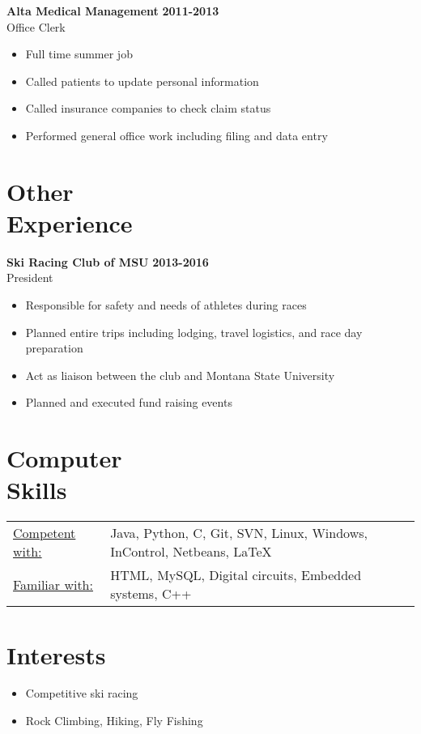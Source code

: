 \documentclass[margin]{res}
\begin{document}
\begin{resume}
\begin{itemize}
\end{itemize}

{\bf  Alta Medical Management} \hfill \textbf{2011-2013}     
\\Office Clerk          
\begin{itemize} \itemsep -2pt
\item Full time summer job
\item Called patients to update personal information
\item Called insurance companies to check claim status
\item Performed general office work including filing and data entry          
\end{itemize}

\noindent\makebox[\linewidth]{\rule{\paperwidth}{0.2pt}}
\section{Other \\ Experience}

{\bf  Ski Racing Club of MSU} \hfill \textbf{2013-2016}      
\\President         
\begin{itemize} \itemsep -2pt
	\item Responsible for safety and needs of athletes during races
	\item Planned entire trips including lodging, travel logistics, and race day preparation
	\item Act as liaison between the club and Montana State University 
	\item Planned and executed fund raising events
	          
\end{itemize}
  


\noindent\makebox[\linewidth]{\rule{\paperwidth}{0.2pt}}

\section{Computer \\ Skills}
   \begin{tabular}{l p{3in}}
    \underline{Competent with:} &  Java, Python, C, Git, SVN, Linux, Windows, InControl,  Netbeans, \LaTeX \\[1mm]
     \underline{Familiar with:} &  HTML, MySQL,  Digital circuits, Embedded systems, C++
 \end{tabular}
 
\noindent\makebox[\linewidth]{\rule{\paperwidth}{0.2pt}}
\section{Interests} 
\begin{itemize} \itemsep -2pt  %

\item Competitive ski racing
\item Rock Climbing, Hiking, Fly Fishing

\end{itemize}
\end{resume} 
\end{document}
